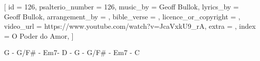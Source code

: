 
[
    id                     = {126},
    psalterio_number       = {126},
    music_by               = {Geoff Bullok},
    lyrics_by              = {Geoff Bullok},
    arrangement_by         = {},
    bible_verse            = {},
    licence_or_copyright   = {},
    video_url              = {https://www.youtube.com/watch?v=JcaVxkU9_rA},
    extra                  = {},
    index                  = {O Poder do Amor},
]


\beginverse*

G - G/F# - Em7- D - G - G/F# - Em7 - C

\endverse*


\beginverse

